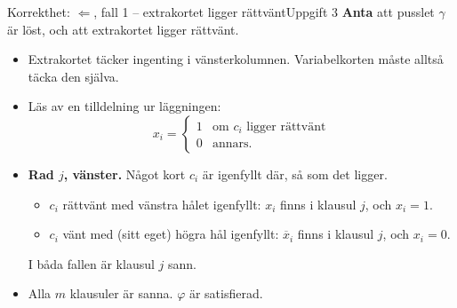 \documentclass[aspectratio=169,10pt]{beamer}
\newcommand{\xbar}[1]{\overline{x}_{#1}}
\begin{document}
\begin{frame}{Korrekthet: $\Leftarrow$, fall 1 -- extrakortet ligger rättvänt}{Uppgift 3}
  \textbf{Anta} att pusslet $\gamma$ är löst, och att extrakortet ligger rättvänt.
  \begin{itemize}
    \item<2-> Extrakortet täcker ingenting i vänsterkolumnen. Variabelkorten måste alltså täcka den själva.
    \item<3-> Läs av en tilldelning ur läggningen:
      \[x_i=\begin{cases}1 & \text{om } c_i \text{ ligger rättvänt}\\ 0 & \text{annars.}\end{cases}\]
    \item<4-> \textbf{Rad $j$, vänster.} Något kort $c_i$ är igenfyllt där, så som det ligger.
      \begin{itemize}
        \item $c_i$ rättvänt med vänstra hålet igenfyllt: $x_i$ finns i klausul $j$, och $x_i=1$.
        \item $c_i$ vänt med (sitt eget) högra hål igenfyllt: $\xbar{i}$ finns i klausul $j$, och $x_i=0$.
      \end{itemize}
      I båda fallen är klausul $j$ sann.
    \item<5-> Alla $m$ klausuler är sanna. $\varphi$ är satisfierad.
  \end{itemize}
\end{frame}
\end{document}
